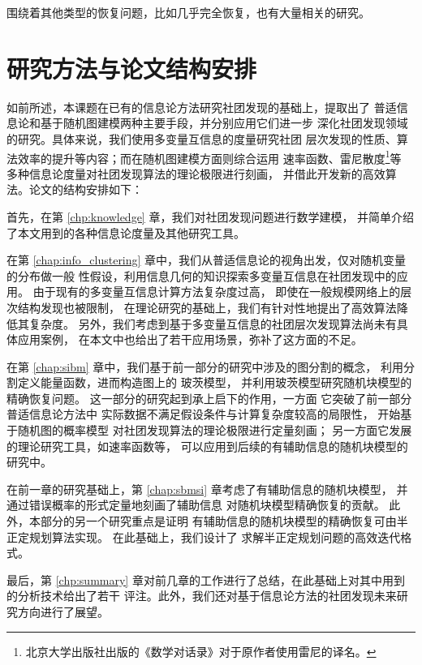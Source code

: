 围绕着其他类型的恢复问题，比如几乎完全恢复，也有大量相关的研究\cite{kanade2016global, deshpande2018contextual}。

\section{研究方法与论文结构安排}
如前所述，本课题在已有的信息论方法研究社团发现的基础上，提取出了
普适信息论和基于随机图建模两种主要手段，并分别应用它们进一步
深化社团发现领域的研究。具体来说，我们使用多变量互信息的度量研究社团
层次发现的性质、算法效率的提升等内容；而在随机图建模方面则综合运用
速率函数、雷尼散度\footnote{北京大学出版社出版的《数学对话录》对于原作者使用雷尼的译名。}等
多种信息论度量对社团发现算法的理论极限进行刻画，
并借此开发新的高效算法。论文的结构安排如下：

首先，在第 \ref{chp:knowledge} 章，我们对社团发现问题进行数学建模，
并简单介绍了本文用到的各种信息论度量及其他研究工具。

在第 \ref{chap:info_clustering} 章中，我们从普适信息论的视角出发，仅对随机变量的分布做一般
性假设，利用信息几何的知识探索多变量互信息在社团发现中的应用。
由于现有的多变量互信息计算方法复杂度过高，
即使在一般规模网络上的层次结构发现也被限制，
在理论研究的基础上，我们有针对性地提出了高效算法降低其复杂度。
另外，我们考虑到基于多变量互信息的社团层次发现算法尚未有具体应用案例，
在本文中也给出了若干应用场景，弥补了这方面的不足。

在第 \ref{chap:sibm} 章中，我们基于前一部分的研究中涉及的图分割的概念，
利用分割定义能量函数，进而构造图上的 玻茨模型，
并利用玻茨模型研究随机块模型的精确恢复问题。
这一部分的研究起到承上启下的作用，一方面
它突破了前一部分普适信息论方法中
实际数据不满足假设条件与计算复杂度较高的局限性，
开始基于随机图的概率模型
对社团发现算法的理论极限进行定量刻画；
另一方面它发展的理论研究工具，如速率函数等，
可以应用到后续的有辅助信息的随机块模型的研究中。

在前一章的研究基础上，第 \ref{chap:sbmsi} 章考虑了有辅助信息的随机块模型，
并通过错误概率的形式定量地刻画了辅助信息
对随机块模型精确恢复的贡献。
此外，本部分的另一个研究重点是证明
有辅助信息的随机块模型的精确恢复可由半正定规划算法实现。
在此基础上，我们设计了
求解半正定规划问题的高效迭代格式。

最后，第 \ref{chp:summary} 章对前几章的工作进行了总结，在此基础上对其中用到的分析技术给出了若干
评注。此外，我们还对基于信息论方法的社团发现未来研究方向进行了展望。